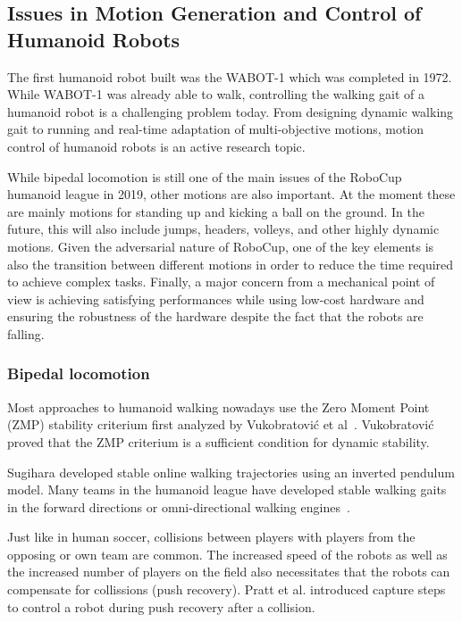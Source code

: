 \documentclass{article}
\begin{document}

\subsection{Issues in Motion Generation and Control of Humanoid Robots}

The first humanoid robot built was the WABOT-1 which was completed in 1972. 
While WABOT-1 was already able to walk, controlling the walking gait of a humanoid robot is a challenging problem today.
From designing dynamic walking gait to running and real-time adaptation of multi-objective motions, motion control of humanoid robots is an active research topic.

While bipedal locomotion is still one of the main issues of the RoboCup humanoid
league in 2019, other motions are also important. 
At the moment these are mainly motions for standing up and kicking a ball on the ground.
In the future, this will also include jumps, headers, volleys, and other highly dynamic motions.
Given the adversarial nature of RoboCup, one of the key elements is also the transition between different motions in order to reduce the time required to achieve complex tasks. 
Finally, a major concern from a mechanical point of view is achieving satisfying performances while using low-cost hardware and ensuring the robustness of the hardware despite the fact that the robots are falling.

\subsubsection{Bipedal locomotion}


Most approaches to humanoid walking nowadays use the Zero Moment Point (ZMP) stability criterium first analyzed by Vukobratović et al~\cite{Vukobratovic2001}.
Vukobratović proved that the ZMP criterium is a sufficient condition for dynamic stability.

Sugihara developed stable online walking trajectories using an inverted pendulum model.
Many teams in the humanoid league have developed stable walking gaits in the forward directions or omni-directional walking engines~\cite{Sugihara2002}.

Just like in human soccer, collisions between players with players from the opposing or own team are common.
The increased speed of the robots as well as the increased number of players on the field also necessitates that the robots can compensate for collissions (push recovery).
Pratt et al. introduced capture steps to control a robot during push recovery after a collision\cite{Pratt2006}.
\end{document}
